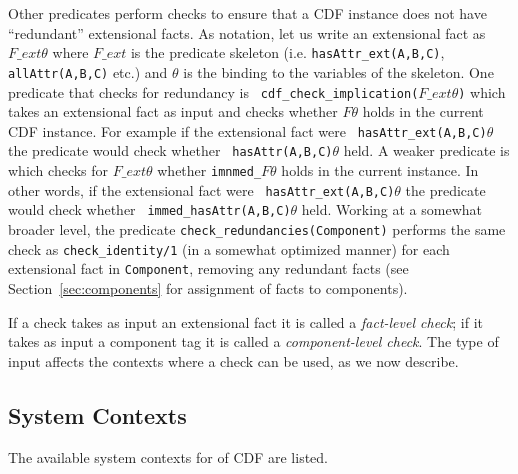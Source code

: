 Other predicates perform checks to ensure that a CDF instance does not
have ``redundant'' extensional facts.  As notation, let us write an
extensional fact as $F\_ext\theta$ where $F\_ext$ is the predicate
skeleton (i.e. {\tt hasAttr\_ext(A,B,C)}, {\tt allAttr(A,B,C)} etc.)
and $\theta$ is the binding to the variables of the skeleton.  One
predicate that checks for redundancy is {\tt
cdf\_check\_implication($F\_ext\theta$)} which takes an extensional
fact as input and checks whether $F\theta$ holds in the current CDF
instance.  For example if the extensional fact were {\tt
hasAttr\_ext(A,B,C)$\theta$} the predicate would check whether {\tt
hasAttr(A,B,C)$\theta$} held.  A weaker predicate is
 which checks for $F\_ext\theta$
whether {\tt imnmed\_$F\theta$} holds in the current instance.  In
other words, if the extensional fact were {\tt
hasAttr\_ext(A,B,C)$\theta$} the predicate would check whether {\tt
immed\_hasAttr(A,B,C)$\theta$} held.  Working at a somewhat broader
level, the predicate {\tt check\_redundancies(Component)} performs the
same check as {\tt check\_identity/1} (in a somewhat optimized manner)
for each extensional fact in {\tt Component}, removing any redundant
facts (see Section~\ref{sec:components} for assignment of facts to
components).

If a check takes as input an extensional fact it is called a {\em
fact-level check}; if it takes as input a component tag it is called a
{\em component-level check}.  The type of input affects the contexts
where a check can be used, as we now describe.

\subsection{System Contexts}

The available system contexts for \version{} of CDF are listed.  


